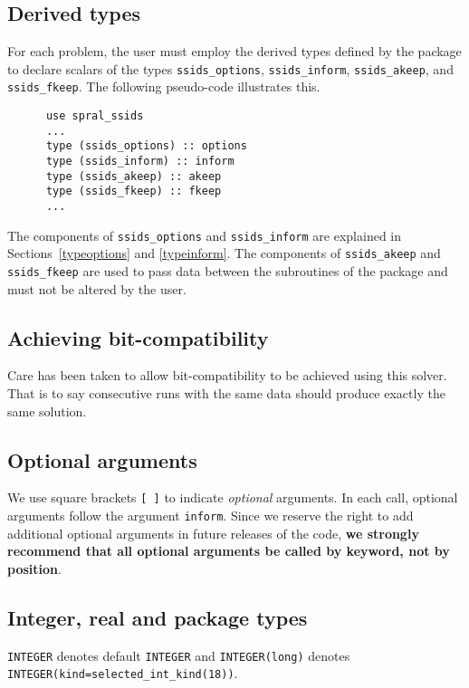 \documentclass{spral}
\begin{document}

\subsection{Derived types} \label{derived types}

For each problem, the user must employ the derived types defined by the
package to declare scalars of the types
{\tt ssids\_options}, {\tt ssids\_inform}, {\tt ssids\_akeep}, and {\tt ssids\_fkeep}.
The following pseudo-code illustrates this.
\begin{verbatim}
      use spral_ssids
      ...
      type (ssids_options) :: options
      type (ssids_inform) :: inform
      type (ssids_akeep) :: akeep
      type (ssids_fkeep) :: fkeep
      ...
\end{verbatim}
The components of {\tt ssids\_options} and {\tt ssids\_inform} are explained
in Sections~\ref{typeoptions} and \ref{typeinform}.
The components of {\tt ssids\_akeep} and {\tt ssids\_fkeep} are used to pass
data between the subroutines of the package and must not be altered by the user.

\subsection{Achieving bit-compatibility} \label{bitcompat}
Care has been taken to allow bit-compatibility to be achieved using this solver.
That is to say consecutive runs with the same data should produce exactly
the same solution.

\subsection{Optional arguments}\label{Optional arguments}

We use square brackets {\tt [ ]} to indicate {\it optional} arguments.
In each
call, optional arguments follow the argument {\tt inform}.  Since we
reserve the right to add additional optional arguments in future
releases of the code, {\bf we strongly recommend that all optional
arguments be called by keyword, not by position}.

\subsection{Integer, real and package types}\label{Integer kinds}

{\tt INTEGER} denotes default {\tt INTEGER} and
{\tt INTEGER(long)} denotes {\tt INTEGER(kind=selected\_int\_kind(18))}.
\end{document}
